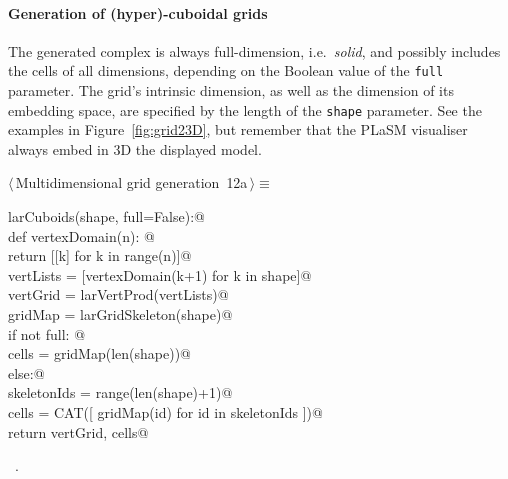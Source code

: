 \documentclass[11pt,oneside]{article}	%
\begin{document}
\paragraph{Generation of (hyper)-cuboidal grids}

The generated complex is always full-dimension, i.e.~\emph{solid}, and possibly includes the cells of all dimensions, depending on the Boolean value of the \texttt{full} parameter.
The grid's intrinsic dimension, as well as the dimension of its embedding space, are specified by the length of the \texttt{shape} parameter. See the examples in Figure~\ref{fig:grid23D}, but remember that the PLaSM visualiser always embed in 3D the displayed model. 

\begin{flushleft} \small \label{scrap16}
\protect{}$\langle\,$Multidimensional grid generation\nobreak\ {\footnotesize 12a}$\,\rangle\equiv$
\vspace{-1ex}
\begin{list}{}{} \item
\mbox{}\verb@def larCuboids(shape, full=False):@\\
\mbox{}\verb@   def vertexDomain(n): @\\
\mbox{}\verb@      return [[k] for k in range(n)]@\\
\mbox{}\verb@   vertLists = [vertexDomain(k+1) for k in shape]@\\
\mbox{}\verb@   vertGrid = larVertProd(vertLists)@\\
\mbox{}\verb@   gridMap = larGridSkeleton(shape)@\\
\mbox{}\verb@   if not full: @\\
\mbox{}\verb@      cells = gridMap(len(shape))@\\
\mbox{}\verb@   else:@\\
\mbox{}\verb@      skeletonIds = range(len(shape)+1)@\\
\mbox{}\verb@      cells = CAT([ gridMap(id) for id in skeletonIds ])@\\
\mbox{}\verb@   return vertGrid, cells@\\
\mbox{}\verb@@{\NWsep}
\end{list}
\vspace{-1ex}
\footnotesize\addtolength{\baselineskip}{-1ex}
\begin{list}{}{\setlength{\itemsep}{-\parsep}\setlength{\itemindent}{-\leftmargin}}
\item \NWtxtMacroRefIn\ .
\end{list}
\end{flushleft}
\end{document}
